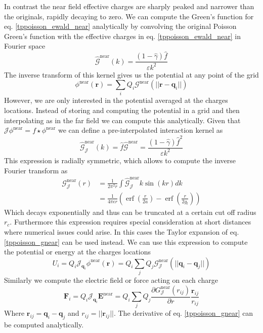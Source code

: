 \documentclass[ twoside,openright,titlepage,numbers=noenddot,%
headinclude,footinclude,cleardoublepage=empty,abstract=on,
BCOR=5mm,paper=a4,fontsize=11pt, dvipsnames
]{scrreprt}
\renewcommand{\vec}[1]{\bm{#1}}
\newcommand{\oper}[1]{\mathcal{#1}}
\newcommand{\near}{\textrm{near}}
\DeclareMathOperator{\erf}{erf}
\newcommand{\ppos}{q}
\newcommand{\fpos}{r}
\begin{document}
In contrast the near field effective charges are sharply peaked and narrower than the originals, rapidly decaying to zero. We can compute the Green's function for eq. \eqref{tppoisson_ewald_near} analytically by convolving the original Poisson Green's function with the effective charges in eq. \eqref{tppoisson_ewald_near} in Fourier space
\begin{equation}
  \hat{\oper{G}}^{\near}(k) = \frac{(1-\hat{\gamma})\hat{f}}{\varepsilon k^2}
\end{equation}
The inverse transform of this kernel gives us the potential at any point of the grid 
\begin{equation}
  \phi^{\near}(\vec{\fpos}) = \sum_i{Q_i\oper{G}^{\near}(||\vec{\fpos}-\vec{\ppos}_i||)}
\end{equation}
However, we are only interested in the potential averaged at the charges locations. Instead of storing and computing the potential in a grid and then interpolating as in the far field we can compute this analytically. Given that $\oper{J} \phi^{\near} = f\star \phi^{\near}$ we can define a pre-interpolated interaction kernel as
\begin{equation}
  \hat{\oper{G}}_{\oper{J}}^{\near}(k) = \hat{f}\hat{\oper{G}}^{\near} = \frac{(1-\hat{\gamma})\hat{f}^2}{\varepsilon k^2}
\end{equation}
This expression is radially symmetric, which allows to compute the inverse Fourier transform as
\begin{equation}
  \label{tppoisson_gnear}
  \begin{aligned}
    \oper{G}_{\oper{J}}^{\near}(r) &= \frac{1}{2\pi^2r}\int{\hat{\oper{G}}^{\near}_{\oper{J}}k \sin(kr)dk} \\
            &= \frac{1}{4\pi\epsilon r}\left(\erf\left(\frac{r}{2a}\right) - \erf\left(\frac{r}{2g_t}\right)\right)
  \end{aligned}
\end{equation}
Which decays exponentially and thus can be truncated at a certain cut off radius $r_c$. Furthermore this expression requires special consideration at short distances where numerical issues could arise. In this cases the Taylor expansion of eq. \eqref{tppoisson_gnear} can be used instead.
We can use this expression to compute the potential or energy at the charges locations
\begin{equation}
  U_i = Q_i\oper{J}_{\vec{\ppos}_i}\phi^{\near}(\vec{\fpos}) = Q_i\sum_j{Q_j\oper{G}_{\oper{J}}^{\near}(||\vec{\ppos}_i - \vec{\ppos}_j||)}
\end{equation}
Similarly we compute the electric field or force acting on each charge 
\begin{equation}
  \vec{F}_i = Q_i \oper{J}_{\vec{\ppos}_i} \vec{E}^{\near} = Q_i\sum_j{Q_j\frac{\partial G_{\oper{J}}^{\near}({r_{ij}})}{\partial r}\frac{\vec{r}_{ij}}{r_{ij}}}
\end{equation}
Where $\vec{r}_{ij} = \vec{\ppos}_i - \vec{\ppos}_j$ and $r_{ij} = ||\vec{r}_{ij}||$. The derivative of eq. \eqref{tppoisson_gnear} can be computed analytically.
\end{document}
